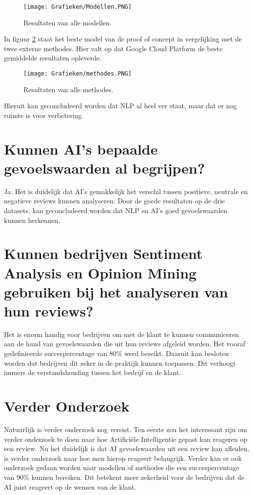 \begin{figure}[!htbp]
    \texttt{[image: Grafieken/Modellen.PNG]}
    \caption{\label{fig:modellen}Resultaten van alle modellen.}
\end{figure}
\FloatBarrier

In figuur \ref{fig:methodes} staat het beste model van de proof of concept in vergelijking met de twee externe methodes. Hier valt op dat Google Cloud Platform de beste gemiddelde resultaten opleverde. 

\begin{figure}[!htbp]
    \texttt{[image: Grafieken/methodes.PNG]}
    \caption{\label{fig:methodes}Resultaten van alle methodes.}
\end{figure}
\FloatBarrier

Hieruit kan geconcludeerd worden dat NLP al heel ver staat, maar dat er nog ruimte is voor verbetering.

\section{Kunnen AI's bepaalde gevoelswaarden al begrijpen?}
\label{sec:gevoelswaarden}
Ja. Het is duidelijk dat AI's gemakkelijk het verschil tussen positieve, neutrale en negatieve reviews kunnen analyseren. Door de goede resultaten op de drie datasets, kan geconcludeerd worden dat NLP en AI's goed gevoelswaarden kunnen herkennen.

\section{Kunnen bedrijven Sentiment Analysis en Opinion Mining gebruiken bij het analyseren van hun reviews?}
\label{sec:reviews}
Het is enorm handig voor bedrijven om met de klant te kunnen communiceren aan de hand van gevoelswaarden die uit hun reviews afgeleid worden.
Het vooraf gedefinieerde succespercentage van 80\% werd bereikt. Daaruit kan besloten worden dat bedrijven dit zeker in de praktijk kunnen toepassen. Dit verhoogt immers de verstandshouding tussen het bedrijf en de klant.

\section{Verder Onderzoek}
\label{sec:verderonderzoek}
Natuurlijk is verder onderzoek nog vereist. Ten eerste zou het interessant zijn om verder onderzoek te doen naar hoe Artificiële Intelligentie gepast kan reageren op een review. Nu het duidelijk is dat AI gevoelswaarden uit een review kan afleiden, is verder onderzoek naar hoe men hierop reageert belangrijk. Verder kan er ook onderzoek gedaan worden naar modellen of methodes die een succespercentage van 90\% kunnen bereiken. Dit betekent meer zekerheid voor de bedrijven dat de AI juist reageert op de wensen van de klant.

